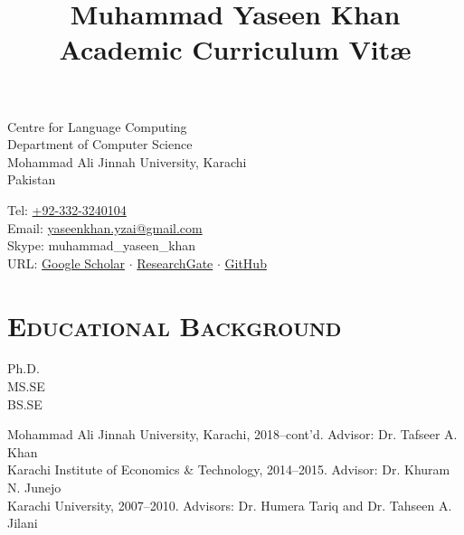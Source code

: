 \documentclass[a4paper, 10pt]{article}
\title{{\Huge Muhammad Yaseen Khan}\\\small Academic Curriculum Vit\ae}
\author{}
\date{}
\begin{document}
\maketitle
\vspace{-3em}
\begin{minipage}{0.45\textwidth}
Centre for Language Computing\\
Department of Computer Science\\
Mohammad Ali Jinnah University, Karachi\\
Pakistan
\end{minipage}
\hfill
\begin{minipage}{0.45\textwidth}
Tel: \href{tel:+923323240104}{+92-332-3240104}\\
Email: \href{mailto:yaseenkhan.yzai@gmail.com}{yaseenkhan.yzai@gmail.com}\\
Skype: muhammad\_yaseen\_khan\\
URL: \href{https://scholar.google.com/citations?user=a_d2KTEAAAAJ&hl=en}{Google Scholar} $\cdot$ \href{https://www.researchgate.net/profile/Muhammad_Yaseen_Khan}{ResearchGate} $\cdot$ \href{https://www.github.com/MuhammadYaseenKhan}{GitHub}
\end{minipage}


\section*{\normalfont\textsc{Educational Background}}
\hfill\begin{minipage}{0.09\textwidth}
Ph.D.\\
MS.SE\\
BS.SE
\end{minipage}%
\begin{minipage}{0.89\textwidth}
Mohammad Ali Jinnah University, Karachi, 2018--cont'd. Advisor: Dr. Tafseer A. Khan\\
Karachi Institute of Economics \& Technology, 2014--2015. Advisor: Dr. Khuram N. Junejo\\
Karachi University, 2007--2010. Advisors: Dr. Humera Tariq and Dr. Tahseen A. Jilani
\end{minipage}

\end{document}

